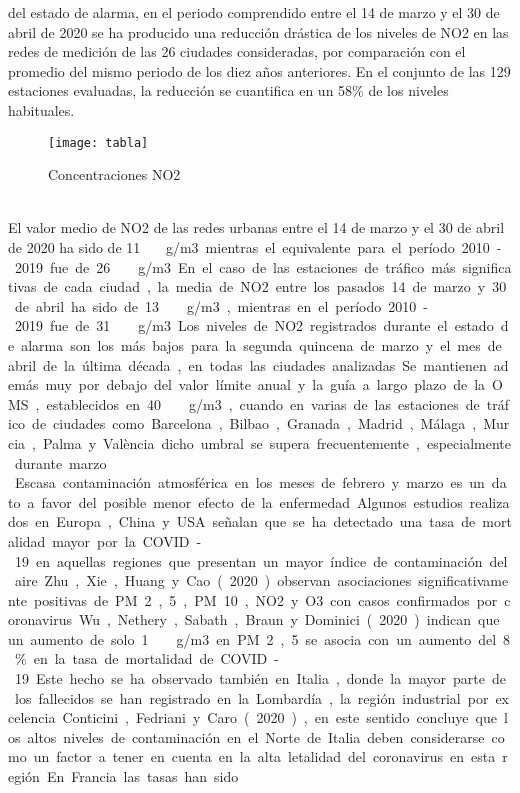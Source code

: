 \documentclass[a4paper,11pt]{article}
\begin{document}
del estado de alarma, en el periodo comprendido entre el 14 de marzo y el 30 de abril de 2020
se ha producido una reducción drástica de los niveles de NO2 en las redes de medición de las 26
ciudades consideradas, por comparación con el promedio del mismo periodo de los diez años
anteriores. En el conjunto de las 129 estaciones evaluadas, la reducción se cuantifica en un 58\%
de los niveles habituales.
\begin{figure}
\centering
\texttt{[image: tabla]}
\caption{Concentraciones NO2}
\label{Figura1}
\end{figure}
\\ El valor medio de NO2 de las redes urbanas entre el 14 de marzo y el 30 de abril de 2020 ha sido de 11 \si\micro\ g/m3 mientras el equivalente para el período 2010-2019 fue de 26 \si\micro\ g/m3. En el caso de las estaciones de tráfico más significativas de cada ciudad, la media de NO2 entre los pasados 14 de marzo y 30 de abril ha sido de 13 \si\micro\ g/m3, mientras en el período 2010-2019 fue de 31 \si\micro\ g/m3.
Los niveles de NO2 registrados durante el estado de alarma son los más bajos para la segunda
quincena de marzo y el mes de abril de la última década, en todas las ciudades analizadas.
Se mantienen además muy por debajo del valor límite anual y la guía a largo plazo de la OMS,
establecidos en 40 \si\micro\ g/m3, cuando en varias de las estaciones de tráfico de ciudades como
Barcelona, Bilbao, Granada, Madrid, Málaga, Murcia, Palma y València dicho umbral se supera
frecuentemente, especialmente durante marzo.
\\ Escasa contaminación atmosférica  en los meses de febrero y marzo es un dato a favor del posible menor efecto de la enfermedad.
Algunos estudios realizados en Europa, China y USA señalan que se ha detectado una tasa de mortalidad
mayor por la COVID-19 en aquellas regiones que presentan un mayor índice de contaminación del
aire. Zhu, Xie, Huang y Cao (2020) observan asociaciones significativamente positivas de PM 2,5, PM 10,
NO2 y O3 con casos confirmados por coronavirus. Wu, Nethery, Sabath, Braun y Dominici (2020) indican
que un aumento de solo 1 \si\micro\ g/m3 en PM 2,5 se asocia con un aumento del 8\% en la tasa de mortalidad de
COVID-19. Este hecho se ha observado también en Italia, donde la mayor parte de los fallecidos se han
registrado en la Lombardía, la región industrial por excelencia. Conticini, Fedriani y Caro (2020), en este
sentido concluye que los altos niveles de contaminación en el Norte de Italia deben considerarse como un
factor a tener en cuenta en la alta letalidad del coronavirus en esta región. En Francia las tasas han sido
\end{document}
